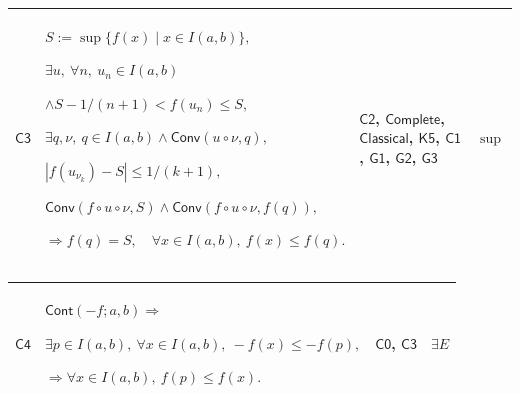 \documentclass[11pt]{amsart}
\newlength{\FTCFourColumnBody}
\begin{document}
{\begin{tabular}
\end{tabular}%
\par\setlength{\parskip}{0pt}\nointerlineskip
\noindent
\begin{tabular}{|@{}>{\centering\arraybackslash}m{0.078431\FTCFourColumnBody}|>{\centering\arraybackslash}m{0.535947\FTCFourColumnBody}|>{\centering\arraybackslash}m{0.281045\FTCFourColumnBody}|>{\centering\arraybackslash}m{0.104575\FTCFourColumnBody}|}\hline
\hypertarget{proof:C3}{$\displaystyle \textsf{C3}$} & $\displaystyle S:=\sup\{f(x)\mid x\in I(a,b)\},$\par
$\displaystyle \exists u,\ \forall n,\ u_n\in I(a,b)$\par
$\displaystyle \land S-1/(n+1)<f(u_n)\le S,$\par
$\displaystyle \exists q,\nu,\ q\in I(a,b)\land\textsf{Conv}(u\circ\nu,q),$\par
$\displaystyle |f(u_{\nu_k})-S|\le1/(k+1),$\par
$\displaystyle \textsf{Conv}(f\circ u\circ\nu,S)\land\textsf{Conv}(f\circ u\circ\nu,f(q)),$\par
$\displaystyle \Rightarrow f(q)=S,\quad\forall x\in I(a,b),\ f(x)\le f(q).$ & \hyperlink{proof:C2}{$\displaystyle \textsf{C2}$}, \hyperlink{ax:Complete}{$\displaystyle \textsf{Complete}$}, \hyperlink{ax:Classical}{$\displaystyle \textsf{Classical}$}, \hyperlink{proof:K5}{$\displaystyle \textsf{K5}$}, \hyperlink{proof:C1}{$\displaystyle \textsf{C1}$}, \hyperlink{proof:G1}{$\displaystyle \textsf{G1}$}, \hyperlink{proof:G2}{$\displaystyle \textsf{G2}$}, \hyperlink{proof:G3}{$\displaystyle \textsf{G3}$} & $\displaystyle \sup$\\ \hline
\end{tabular}%
\par\setlength{\parskip}{0pt}\nointerlineskip
\noindent
\begin{tabular}{|@{}>{\centering\arraybackslash}m{0.078431\FTCFourColumnBody}|>{\centering\arraybackslash}m{0.535947\FTCFourColumnBody}|>{\centering\arraybackslash}m{0.281045\FTCFourColumnBody}|>{\centering\arraybackslash}m{0.104575\FTCFourColumnBody}|}\hline
\hypertarget{proof:C4}{$\displaystyle \textsf{C4}$} & $\displaystyle \textsf{Cont}(-f;a,b)\Rightarrow$\par
$\displaystyle \exists p\in I(a,b),\ \forall x\in I(a,b),\ -f(x)\le-f(p),$\par
$\displaystyle \Rightarrow\forall x\in I(a,b),\ f(p)\le f(x).$ & \hyperlink{proof:C0}{$\displaystyle \textsf{C0}$}, \hyperlink{proof:C3}{$\displaystyle \textsf{C3}$} & $\displaystyle \exists E$\\ \hline

\end{tabular}}
\end{document}
